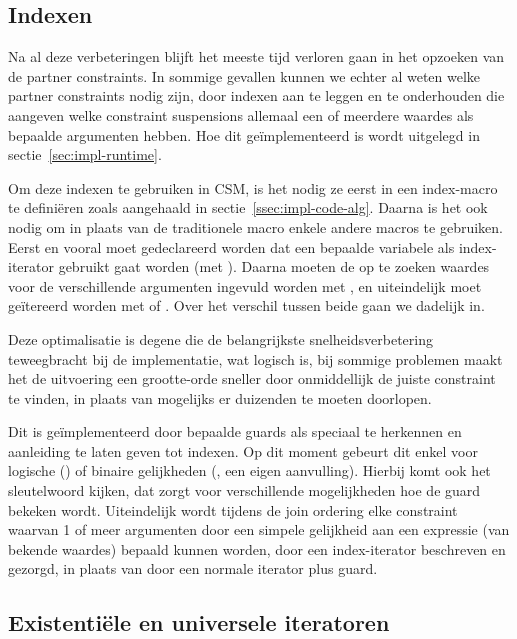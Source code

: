 \subsection{Indexen}

Na al deze verbeteringen blijft het meeste tijd verloren gaan in het opzoeken van de partner constraints. In sommige gevallen kunnen we echter al weten welke partner constraints nodig zijn, door indexen aan te leggen en te onderhouden die aangeven welke constraint suspensions allemaal een of meerdere waardes als bepaalde argumenten hebben. Hoe dit ge\"implementeerd is wordt uitgelegd in sectie~\ref{sec:impl-runtime}.

Om deze indexen te gebruiken in CSM, is het nodig ze eerst in een index-macro te defini\"eren zoals aangehaald in sectie~\ref{ssec:impl-code-alg}. Daarna is het ook nodig om in plaats van de traditionele  macro enkele andere macros te gebruiken. Eerst en vooral moet gedeclareerd worden dat een bepaalde variabele als index-iterator gebruikt gaat worden (met ). Daarna moeten de op te zoeken waardes voor de verschillende argumenten ingevuld worden met , en uiteindelijk moet ge\"itereerd worden met  of . Over het verschil tussen beide gaan we dadelijk in.

Deze optimalisatie is degene die de belangrijkste snelheidsverbetering teweegbracht bij de implementatie, wat logisch is, bij sommige problemen maakt het de uitvoering een grootte-orde sneller door onmiddellijk de juiste constraint te vinden, in plaats van mogelijks er duizenden te moeten doorlopen.

Dit is ge\"implementeerd door bepaalde guards als speciaal te herkennen en aanleiding te laten geven tot indexen. Op dit moment gebeurt dit enkel voor logische (\code{==}) of binaire gelijkheden (, een eigen aanvulling). Hierbij komt ook het  sleutelwoord kijken, dat zorgt voor verschillende mogelijkheden hoe de guard bekeken wordt. Uiteindelijk wordt tijdens de join ordering elke constraint waarvan 1 of meer argumenten door een simpele gelijkheid aan een expressie (van bekende waardes) bepaald kunnen worden, door een index-iterator beschreven en gezorgd, in plaats van door een normale iterator plus guard.

\subsection{Existenti\"ele en universele iteratoren}

